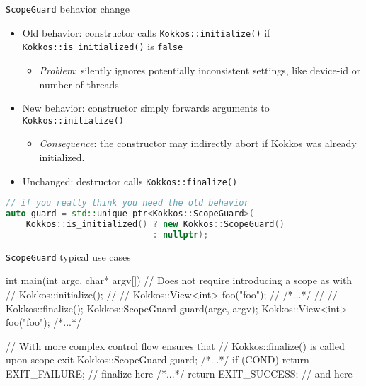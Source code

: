 
\begin{frame}[fragile]{\texttt{ScopeGuard} behavior change}

\begin{itemize}
\item Old behavior: constructor calls \texttt{Kokkos::initialize()} if \texttt{Kokkos::is\_initialized()} is \texttt{false}
\begin{itemize}
\item \textit{Problem}: silently ignores potentially inconsistent settings, like device-id or number of threads
\end{itemize}
\item New behavior: constructor simply forwards arguments to \texttt{Kokkos::initialize()}
\begin{itemize}
\item \textit{Consequence}: the constructor may indirectly abort if Kokkos was already initialized.
\end{itemize}
\item Unchanged: destructor calls \texttt{Kokkos::finalize()}
\end{itemize}
        
\vspace{2em}
{\tiny
\begin{lstlisting}[language=c++]
// if you really think you need the old behavior
auto guard = std::unique_ptr<Kokkos::ScopeGuard>(
    Kokkos::is_initialized() ? new Kokkos::ScopeGuard()
                             : nullptr);
\end{lstlisting}
}

\end{frame}


\begin{frame}[fragile]{\texttt{ScopeGuard} typical use cases}
\begin{code}[keywords={ScopeGuard}]
int main(int argc, char* argv[]) {
  // Does not require introducing a scope as with
  // Kokkos::initialize();
  // {
  //   Kokkos::View<int> foo("foo");
  //   /*...*/
  // }
  // Kokkos::finalize();
  Kokkos::ScopeGuard guard(argc, argv);
  Kokkos::View<int> foo("foo");
  /*...*/
}
\end{code}

\begin{code}[keywords={ScopeGuard}]
// With more complex control flow ensures that
// Kokkos::finalize() is called upon scope exit
Kokkos::ScopeGuard guard;
/*...*/
if (COND)
  return EXIT_FAILURE;  // finalize here
/*...*/
return EXIT_SUCCESS;    // and here
\end{code}
\end{frame}


